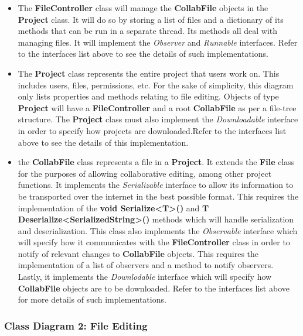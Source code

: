 \documentclass[twoside,letterpaper]{article}
\begin{document}
	\begin{itemize}
		\item The \textbf{FileController} class will manage the \textbf{CollabFile} objects in the \textbf{Project} class. It will do so by storing a list of files and a dictionary of its methods that can be run in a separate thread. Its methods all deal with managing files. It will implement the \textit{Observer} and \textit{Runnable} interfaces. Refer to the interfaces list above to see the details of such implementations.
		\item The \textbf{Project} class represents the entire project that users work on. This includes users, files, permissions, etc. For the sake of simplicity, this diagram only lists properties and methods relating to file editing. Objects of type \textbf{Project} will have a \textbf{FileController} and a root \textbf{CollabFile} as per a file-tree structure. The \textbf{Project} class must also implement the \textit{Downloadable} interface in order to specify how projects are downloaded.Refer to the interfaces list above to see the details of this implementation.
		\item the \textbf{CollabFile} class represents a file in a \textbf{Project}. It extends the \textbf{File} class for the purposes of allowing collaborative editing, among other project functions. It implements the \textit{Serializable} interface to allow its information to be transported over the internet in the best possible format. This requires the implementation of the \textbf{void Serialize<T>()} and \textbf{T Deserialize<SerializedString>()} methods which will handle serialization and deserialization. This class also implements the \textit{Observable} interface which will specify how it communicates with the \textbf{FileController} class in order to notify of relevant changes to \textbf{CollabFile} objects. This requires the implementation of a list of observers and a method to notify observers. Lastly, it implements the \textit{Downlodable} interface which will specify how \textbf{CollabFile} objects are to be downloaded. Refer to the interfaces list above for more details of such implementations.
	\end{itemize}
	
	\subsubsection[Class Diagram 2: File Editing]{\rmfamily\bfseries\color{black}
		Class Diagram 2: File Editing}
	\hypertarget{RefHeading22059017292}{}
	\bigskip
	
\end{document}
